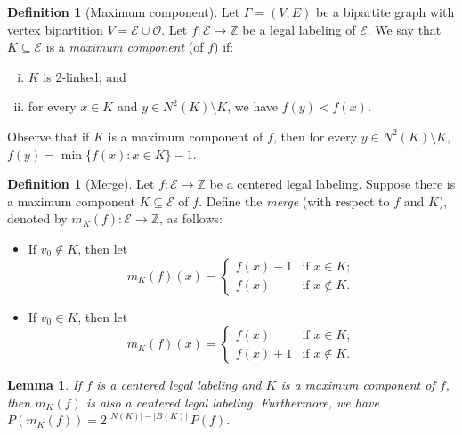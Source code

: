 \documentclass{amsart}
\newtheorem{lem}[thm]{Lemma}
\theoremstyle{definition}
\newtheorem{mydef}[thm]{Definition}
\newcommand{\cO}{\mathcal{O} }
\newcommand{\cE}{\mathcal{E} }
\newcommand{\0}[0]{\emptyset}
\begin{document}
\begin{mydef}[Maximum component]\label{def:max-component}
Let $\Gamma=(V, E)$ be a bipartite graph with vertex bipartition $V=\cE\cup\cO$.
Let $f:\cE\to\mathbb{Z}$ be a legal labeling of $\cE$. We say that $K\subseteq \cE$ is a \textit{maximum component} (of $f$) if:
\begin{enumerate}[(i)]
    \item $K$ is 2-linked; and
    \item for every $x\in K$ and $y\in N^2(K)\setminus K$, we have $f(y)<f(x)$.
\end{enumerate}
\end{mydef}

Observe that if $K$ is a maximum component of $f$, then for every $y \in N^2(K) \setminus K$, $f(y)=\min\{f(x):x \in K\}-1$.

\begin{mydef}[Merge] 
Let $f:\cE\to\mathbb{Z}$ be a centered legal labeling. Suppose there is a maximum component $K\subseteq \cE$ of $f$. Define the \textit{merge} (with respect to $f$ and $K$), denoted by $m_K(f):\cE\to\mathbb{Z}$, as follows:
\begin{itemize}
    \item If $v_0\notin K$, then let
    \[
    m_K(f)(x)=\begin{cases}f(x)-1 & \text{if } x \in K;\\ f(x) & \text{if } x \notin K.\end{cases}
    \]
    \item If $v_0\in K$, then let
    \[
    m_K(f)(x)=\begin{cases}f(x) & \text{if } x \in K;\\ f(x)+1 & \text{if } x \notin K.\end{cases}
    \]
\end{itemize}
\end{mydef}

\begin{lem}\label{obs:merge-preserve-labeling}
If $f$ is a centered legal labeling and $K$ is a maximum component of $f$, then $m_K(f)$ is also a centered legal labeling. Furthermore, we have $P(m_K(f))=2^{\,|N(K)|-|B(K)|}\,P(f)$.
\end{lem}
\end{document}
